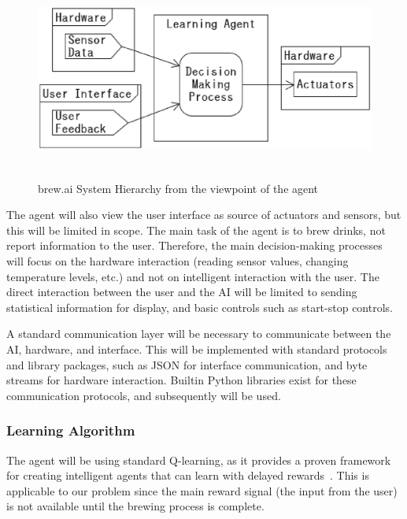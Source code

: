 \documentclass[draftclsnofoot,onecolumn,letterpaper,10pt]{IEEEtran}
\begin{document}
\begin{figure}[h]\begin{center}
	\caption{brew.ai System Hierarchy from the viewpoint of the agent \label{fig:AIsystemDesign}}
	\includegraphics[height=18em]{highView.eps}
\end{center}
\end{figure}

The agent will also view the user interface as source of actuators and sensors, but this will be limited in scope.
The main task of the agent is to brew drinks, not report information to the user.
Therefore, the main decision-making processes will focus on the hardware interaction (reading sensor values, changing temperature levels, etc.) and not on intelligent interaction with the user.
The direct interaction between the user and the AI will be limited to sending statistical information for display, and basic controls such as start-stop controls.

A standard communication layer will be necessary to communicate between the AI, hardware, and interface.
This will be implemented with standard protocols and library packages, such as JSON for interface communication, and byte streams for hardware interaction.
Builtin Python libraries exist for these communication protocols, and subsequently will be used.

\subsubsection{Learning Algorithm} 
The agent will be using standard Q-learning, as it provides a proven framework for creating intelligent agents that can learn with delayed rewards~\cite{SuttonBarto}.
This is applicable to our problem since the main reward signal (the input from the user) is not available until the brewing process is complete.
\end{document}
